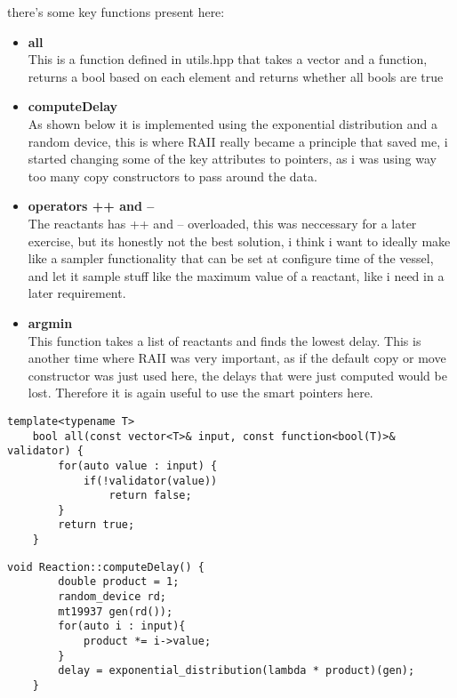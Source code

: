 there's some key functions present here:
\begin{itemize}
    \item{
        \textbf{all}\\
        This is a function defined in utils.hpp that takes a vector and a function, returns a bool based on each element and returns whether all bools are true
    }
    \item{
        \textbf{computeDelay}\\
        As shown below it is implemented using the exponential distribution and a random device, this is where RAII really became a principle that saved me, i started changing some of the key attributes to pointers, as i was using way too many copy constructors to pass around the data.
    }
    \item{
        \textbf{operators ++ and --}\\
        The reactants has ++ and -- overloaded, this was neccessary for a later exercise, but its honestly not the best solution, i think i want to ideally make like a sampler functionality that can be set at configure time of the vessel, and let it sample stuff like the maximum value of a reactant, like i need in a later requirement.
    }
    \item{
        \textbf{argmin}\\
        This function takes a list of reactants and finds the lowest delay. This is another time where RAII was very important, as if the default copy or move constructor was just used here, the delays that were just computed would be lost. Therefore it is again useful to use the smart pointers here.
    }
\end{itemize}

\begin{lstlisting}[style=colorC++]
    template<typename T>
    bool all(const vector<T>& input, const function<bool(T)>& validator) {
        for(auto value : input) {
            if(!validator(value))
                return false;
        }
        return true;
    }
\end{lstlisting}

\begin{lstlisting}[style=colorC++]
    void Reaction::computeDelay() {
        double product = 1;
        random_device rd;
        mt19937 gen(rd());
        for(auto i : input){
            product *= i->value;
        }
        delay = exponential_distribution(lambda * product)(gen);
    }
\end{lstlisting}

